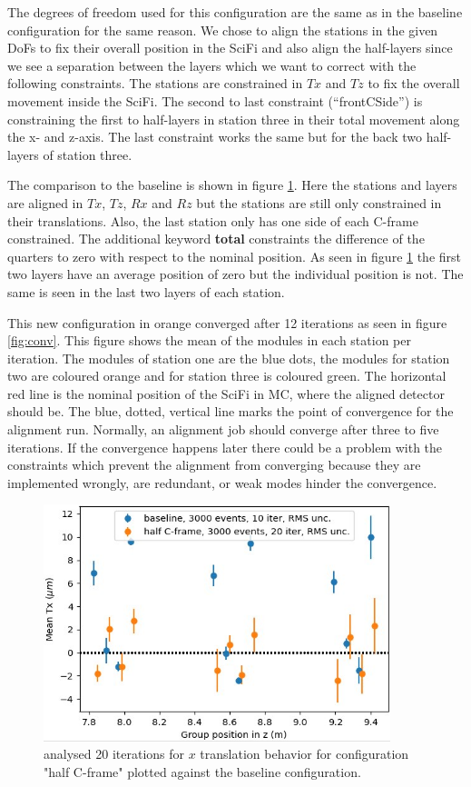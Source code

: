The degrees of freedom used for this configuration are the same as in the baseline configuration for the same reason.
We chose to align the stations in the given DoFs to fix their overall position in the SciFi and also align the half-layers since we see a separation between the layers which we want to correct with the following constraints.
The stations are constrained in $Tx$ and $Tz$ to fix the overall movement inside the SciFi. The second to last constraint (``frontCSide'') is constraining the first to half-layers in station three in their total movement along the x- and z-axis.
The last constraint works the same but for the back two half-layers of station three.

The comparison to the baseline is shown in figure \ref{fig:june_3}.
Here the stations and layers are aligned in $Tx$, $Tz$, $Rx$ and $Rz$ but the stations are still only constrained in their translations. Also, the last station only has one side of each C-frame constrained. The additional keyword \textbf{total} constraints
the difference of the quarters to zero with respect to the nominal position. As seen in figure \ref{fig:june_3} the first two layers have an average position of zero but the individual position is not. The same is seen in the last two layers of each station.

This new configuration in orange converged after 12 iterations as seen in figure \ref{fig:conv}.
This figure shows the mean of the modules in each station per iteration. The modules of station one are the blue dots, the modules for station two are coloured orange and for station three is coloured green.
The horizontal red line is the nominal position of the SciFi in MC, where the aligned detector should be.
The blue, dotted, vertical line marks the point of convergence for the alignment run.
Normally, an alignment job should converge after three to five iterations. If the convergence happens later there could be a problem with the constraints which prevent the alignment from converging because they are implemented wrongly, are redundant, or weak modes hinder the convergence.

\begin{figure}
  \centering
  \includegraphics[width=0.9\textwidth]{plots/renewed_plots/lxplus/4_5.jpeg}
  \caption{analysed 20 iterations for $x$ translation behavior for configuration "half C-frame" plotted against the baseline configuration.}
  \label{fig:june_3}
\end{figure}

